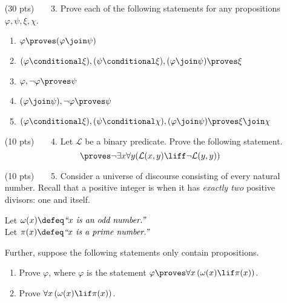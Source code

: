 \begin{enumerate}
\begin{enumerate}
    \end{enumerate}
  \item[(30 pts)~~~~3.]
    Prove each of the following statements for any propositions $\varphi, \psi, \xi, \chi$.
    \begin{enumerate}
      \item
        $\varphi \proves (\varphi \join \psi)$%
      \item
        $(\varphi \conditional \xi), (\psi \conditional \xi), (\varphi \join \psi) \proves \xi$%
      \item
        $\varphi, \neg \varphi \proves \psi$%
      \item
        $(\varphi \join \psi), \neg \varphi \proves \psi$%
      \item
          $(\varphi \conditional \xi), (\psi \conditional \chi), (\varphi \join \psi) \proves \xi \join \chi$%
    \end{enumerate}
  \item[(10 pts)~~~~4.]
    Let $\mathcal{L}$ be a binary predicate.
    Prove the following statement.%
    \begin{equation*}
      \proves \neg \exists x \forall y (\mathcal{L}(x, y) \liff \neg \mathcal{L}(y, y))
    \end{equation*}
  \item[(10 pts)~~~~5.]
    Consider a universe of discourse consisting of every natural number.%
    Recall that a positive integer is  when it has \emph{exactly two} positive divisors: one and itself.

    Let $\omega(x) \defeq \emph{``}x\emph{ is an odd number.''}$ \\
    Let $\pi(x) \defeq \emph{``}x\emph{ is a prime number.''}$

    Further, suppose the following statements only contain propositions.
    \begin{enumerate}
      \item
        Prove $\varphi$, where $\varphi$ is the statement $\varphi \proves \forall x \left(\omega(x) \lif \pi(x)\right)$.
      \item
        Prove $\forall x \left(\omega(x) \lif \pi(x)\right)$.
  \end{enumerate}
\end{enumerate}


